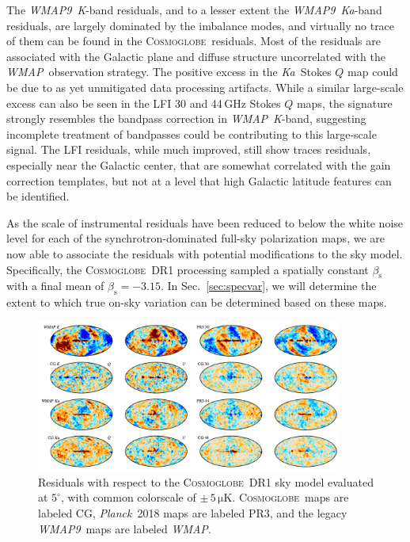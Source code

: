 \documentclass[twocolumn]{../../common/aa}
\def\WMAP{\emph{WMAP}}
\def\WMAPnine{\emph{WMAP9}}
\def\Planck{\emph{Planck}}
\newcommand{\cosmoglobe}{\textsc{Cosmoglobe}}
\newcommand{\K}[0]{\textit K}
\newcommand{\Ka}[0]{\textit{Ka}}
\begin{document}
The \WMAPnine\ \K-band residuals, and to a lesser extent the \WMAPnine\ \Ka-band residuals, are largely dominated by the imbalance modes, and virtually no trace of them can be found in the \cosmoglobe\ residuals. Most of the residuals are associated with the Galactic plane and diffuse structure uncorrelated with the \WMAP\ observation strategy. The positive excess in the \Ka\ Stokes $Q$ map could be due to as yet unmitigated data processing artifacts. While a similar large-scale excess can also be seen in the LFI 30 and 44\,GHz Stokes $Q$ maps, the signature strongly resembles the bandpass correction in \WMAP\ \K-band, suggesting incomplete treatment of bandpasses could be contributing to this large-scale signal.
The LFI residuals, while much improved, still show traces residuals, especially near the Galactic center, that are somewhat correlated with the gain correction templates, but not at a level that high Galactic latitude features can be identified. 

As the scale of instrumental residuals have been reduced to below the white noise level for each of the synchrotron-dominated full-sky polarization maps, we are now able to associate the residuals with potential modifications to the sky model. Specifically, the \cosmoglobe\ DR1 processing sampled a spatially constant $\beta_\mathrm s$ with a final mean of $\beta_\mathrm s=-3.15$. In Sec.~\ref{sec:specvar}, we will determine the extent to which true on-sky variation can be determined based on these maps.

\begin{figure}
	\begin{center}
	\includegraphics[width=0.9\textwidth]{figures/CG_DR1_residuals.pdf}
	\end{center}
	\caption{Residuals with respect to the \cosmoglobe\ DR1 sky model evaluated at $5^\circ$, with common colorscale of $\pm\,5\,\mathrm{\mu K}$. \cosmoglobe\ maps are labeled CG, \Planck\ 2018 maps are labeled PR3, and the legacy \WMAPnine\ maps are labeled \WMAP.
	}
	\label{fig:cg_residuals}
\end{figure}
\end{document}
